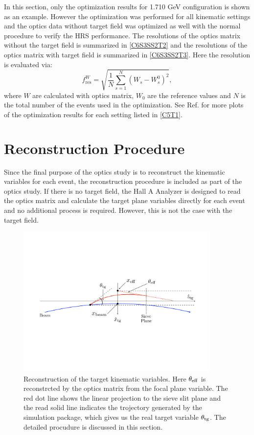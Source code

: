 In this section, only the optimization results for 1.710 GeV configuration is shown as an example. However the optimization was performed for all kinematic settings and the optics data without target field was optimized as well with the normal procedure to verify the HRS performance. The resolutions of the optics matrix without the target field is summarized in \cref{C6S3SS2T2} and the resolutions of the optics matrix with target field is summarized in \cref{C6S3SS2T3}. Here the resolution is evaluated via:
\begin{equation} \label{C6S3SS2E3}
f_{\mathrm{res}}^W = \sqrt{\frac{1}{N}\sum_{s=1}^N(W_s-W_s^0)^2},
\end{equation}
where $W$ are calculated with optics matrix, $W_0$ are the reference values and $N$ is the total number of the events used in the optimization. See Ref. \cite{OPTICSWIKI} for more plots of the optimization results for each setting listed in \cref{C5T1}.

\section{Reconstruction Procedure}
\label{C6S4}

Since the final purpose of the optics study is to reconstruct the kinematic variables for each event, the reconstruction procedure is included as part of the optics study. If there is no target field, the Hall A Analyzer is designed to read the optics matrix and calculate the target plane variables directly for each event \cite{Hansen2015} and no additional process is required. However, this is not the case with the target field.

\begin{figure}[b!]
  \centering
  \includegraphics[width=0.9\textwidth]{figs/reconstruction.pdf}
  \caption[Reconstruction of the target kinematic variables.]{Reconstruction of the target kinematic variables. Here $\theta_{\mathrm{eff}}$ is reconstrcted by the optics matrix from the focal plane variable. The red dot line shows the linear projection to the sieve slit plane and the read solid line indicates the trojectory generated by the simulation package, which gives us the real target variable $\theta_{\mathrm{tg}}$. The detailed procudure is discussed in this section.  \label{C6S4F1}}
\end{figure}

